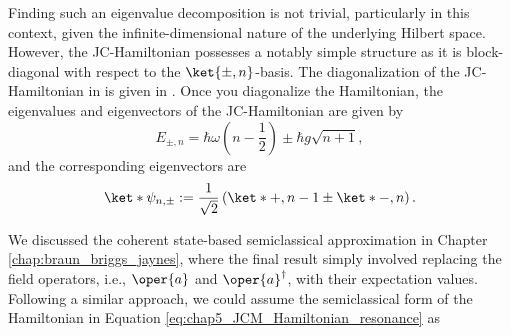 Finding such an eigenvalue decomposition is not trivial, particularly in this context, 
given the infinite-dimensional nature of the underlying Hilbert space. However, the 
JC-Hamiltonian possesses a notably simple structure as it is block-diagonal with respect 
to the $\ket{\pm, n}$-basis. The diagonalization of the JC-Hamiltonian in 
 is given in  .
Once you diagonalize the Hamiltonian, the eigenvalues and eigenvectors of the JC-Hamiltonian are given by
\begin{equation}
        \label{eq:chap5_JCM_eigenvalues}
        E_{\pm, n} = \hbar \omega \left(n - \frac{1}{2}\right) \pm \hbar g \sqrt{n + 1},
\end{equation}
and the corresponding eigenvectors are
\begin{equation}
        \label{eq:chap5_JCM_eigenvectors}
        \ket*{\psi_{n,\pm}} := \frac{1}{\sqrt{2}} 
     \left( \ket*{+, n - 1} \pm \ket*{-, n} \right).
\end{equation}

We discussed the coherent state-based semiclassical approximation in Chapter 
\ref{chap:braun_briggs_jaynes}, where the final result simply involved replacing 
the field operators, i.e., \( \oper{a} \) and \( \oper{a}^\dagger \), with their 
expectation values. Following a similar approach, we could assume the semiclassical form 
of the Hamiltonian in Equation \ref{eq:chap5_JCM_Hamiltonian_resonance} as

